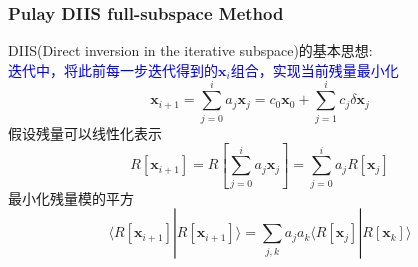 \documentclass[cjk,slidestop,compress,mathserif,blue]{beamer}
\begin{document}
\frame
{
	\frametitle{\textrm{Pulay DIIS full-subspace Method}}
	\textrm{DIIS(Direct inversion in the iterative subspace)}的基本思想:~\\
	\textcolor{blue}{迭代中，将此前每一步迭代得到的$\mathbf{x}_i$组合，实现当前残量最小化}
	\begin{displaymath}
		\mathbf{x}_{i+1}=\sum_{j=0}^ia_j\mathbf{x}_{j}=c_0\mathbf{x}_0+\sum_{j=1}^ic_j\delta\mathbf{x}_{j}
	\end{displaymath}
	假设残量可以线性化表示
	\begin{displaymath}
		R[\mathbf{x}_{i+1}]=R[\sum_{j=0}^ia_j\mathbf{x}_{j}]=\sum_{j=0}^ia_jR[\mathbf{x}_{j}]
	\end{displaymath}
	最小化残量模的平方
	\begin{displaymath}
		\langle R[\mathbf{x}_{i+1}]|R[\mathbf{x}_{i+1}]\rangle=\sum_{j,k}a_ja_k\langle R[\mathbf{x}_{j}]|R[\mathbf{x}_{k}]\rangle
	\end{displaymath}
}
\end{document}
